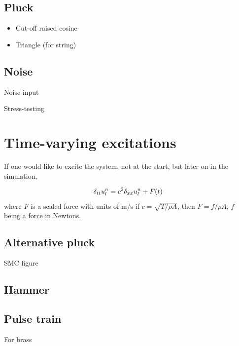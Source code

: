 \subsection{Pluck}\label{sec:pluck}
\begin{itemize}
    \item Cut-off raised cosine
    \item Triangle (for string)
\end{itemize}

\subsection{Noise}
Noise input

Stress-testing

\section{Time-varying excitations}
If one would like to excite the system, not at the start, but later on in the simulation, 

\begin{equation}
    \delta_{tt} u_l^n = c^2 \delta_{xx} u_l^n + F(t)
\end{equation}
where $F$ is a scaled force with units of m/s
if $c=\sqrt{T/\rho A}$, then $F = f/\rho A$, $f$ being a force in Newtons.


\subsection{Alternative pluck}
SMC figure

\subsection{Hammer}


\subsection{Pulse train}
For brass


